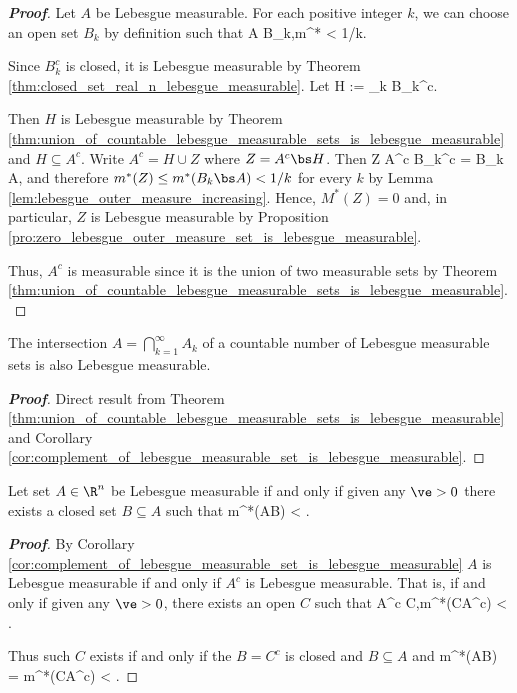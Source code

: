 \begin{proof}[\bf Proof]
Let $A$ be Lebesgue measurable. For each positive integer $k$, we can choose an open set $B_k$ by definition such that
\be
A \subseteq B_k,\qquad m^* < 1/k.
\ee

Since $B_k^c$ is closed, it is Lebesgue measurable by Theorem \ref{thm:closed_set_real_n_lebesgue_measurable}. Let
\be
H := \bigcup_k B_k^c.
\ee

Then $H$ is Lebesgue measurable by Theorem \ref{thm:union_of_countable_lebesgue_measurable_sets_is_lebesgue_measurable} and $H \subseteq A^c$. Write $A^c = H \cup Z$ where $Z = A^c\bs H$. Then
\be
Z \subseteq A^c \bs B_k^c = B_k \bs A,
\ee
and therefore $m^*(Z) \leq m^*(B_k\bs A) <  1/k$ for every $k$ by Lemma \ref{lem:lebesgue_outer_measure_increasing}. Hence, $M^*(Z) = 0$ and, in particular, $Z$ is Lebesgue measurable by Proposition \ref{pro:zero_lebesgue_outer_measure_set_is_lebesgue_measurable}.

Thus, $A^c$ is measurable since it is the union of two measurable sets by Theorem \ref{thm:union_of_countable_lebesgue_measurable_sets_is_lebesgue_measurable}.
\end{proof}



\begin{corollary}\label{cor:countable_intersection_lebesgue_measurable_sets_is_lebesgue_measurable}
The intersection $A = \bigcap_{k=1}^\infty A_k$ of a countable number of Lebesgue measurable sets is also Lebesgue measurable.
\end{corollary}

\begin{proof}[\bf Proof]
Direct result from Theorem \ref{thm:union_of_countable_lebesgue_measurable_sets_is_lebesgue_measurable} and Corollary \ref{cor:complement_of_lebesgue_measurable_set_is_lebesgue_measurable}.
\end{proof}


\begin{corollary}\label{cor:lebesgue_measurable_iff_contains_closed_set_and_difference_set_small}
Let set $A\in\R^n$ be Lebesgue measurable if and only if given any $\ve >0$ there exists a closed set $B\subseteq A$ such that
\be
m^*(A\bs B) < \ve.
\ee
\end{corollary}

\begin{proof}[\bf Proof]
By Corollary \ref{cor:complement_of_lebesgue_measurable_set_is_lebesgue_measurable} $A$ is Lebesgue measurable if and only if $A^c$ is Lebesgue measurable. That is, if and only if given any $\ve>0$, there exists an open $C$ such that
\be
A^c \subseteq C,\qquad m^*(C\bs A^c) < \ve.
\ee

Thus such $C$ exists if and only if the $B = C^c$ is closed and $B \subseteq A$ and
\be
m^*(A\bs B) = m^*(C\bs A^c) < \ve.
\ee
\end{proof}



